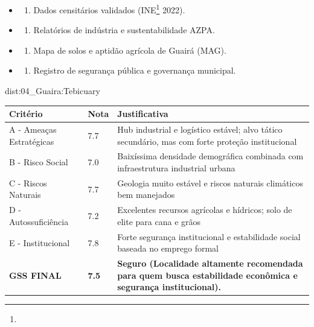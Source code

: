 {\begin{itemize}
\tightlist
\item
  \begin{enumerate}
  \def\labelenumi{\arabic{enumi})}
  \tightlist
  \item
    Dados censitários validados (INE\footnote{\fineINE} 2022).
  \end{enumerate}
\item
  \begin{enumerate}
  \def\labelenumi{\arabic{enumi})}
  \setcounter{enumi}{1}
  \tightlist
  \item
    Relatórios de indústria e sustentabilidade AZPA.
  \end{enumerate}
\item
  \begin{enumerate}
  \def\labelenumi{\arabic{enumi})}
  \setcounter{enumi}{2}
  \tightlist
  \item
    Mapa de solos e aptidão agrícola de Guairá (MAG).
  \end{enumerate}
\item
  \begin{enumerate}
  \def\labelenumi{\arabic{enumi})}
  \setcounter{enumi}{3}
  \tightlist
  \item
    Registro de segurança pública e governança municipal.
  \end{enumerate}
\end{itemize}}{dist:04_Guaira:Tebicuary}
\begin{table}[ht!]
\small \begin{tabular}{p{3.0cm}p{0.8cm}p{6.0cm}} \toprule
\textbf{Critério} & \textbf{Nota} & \textbf{Justificativa} \\ \midrule
A - Ameaças Estratégicas & 7.7 & Hub industrial e logístico estável; alvo tático secundário, mas com forte proteção institucional \\
B - Risco Social & 7.0 & Baixíssima densidade demográfica combinada com infraestrutura industrial urbana \\
C - Riscos Naturais & 7.7 & Geologia muito estável e riscos naturais climáticos bem manejados \\
D - Autossuficiência & 7.2 & Excelentes recursos agrícolas e hídricos; solo de elite para cana e grãos \\
E - Institucional & 7.8 & Forte segurança institucional e estabilidade social baseada no emprego formal \\
\midrule \textbf{GSS FINAL} & \textbf{7.5} & \textbf{Seguro (Localidade altamente recomendada para quem busca estabilidade econômica e segurança institucional).} \\ \bottomrule \end{tabular}
\end{table}
